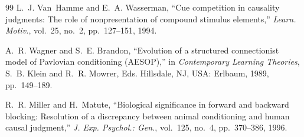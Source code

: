 \documentclass[conference,a4paper]{IEEEtran}
\begin{document}
\begin{thebibliography}{99}
L.~J. Van~Hamme and E.~A. Wasserman, ``Cue competition in causality judgments: The
role of nonpresentation of compound stimulus elements,'' \emph{Learn. Motiv.},
vol.~25, no.~2, pp.~127--151, 1994.

A.~R. Wagner and S.~E. Brandon, ``Evolution of a structured connectionist model of
Pavlovian conditioning (AESOP),'' in \emph{Contemporary Learning Theories},
S.~B. Klein and R.~R. Mowrer, Eds. Hillsdale, NJ, USA: Erlbaum, 1989, pp.~149--189.

R.~R. Miller and H.~Matute, ``Biological significance in forward and backward
blocking: Resolution of a discrepancy between animal conditioning and human causal
judgment,'' \emph{J. Exp. Psychol.: Gen.}, vol.~125, no.~4, pp.~370--386, 1996.

\end{thebibliography}
\end{document}
